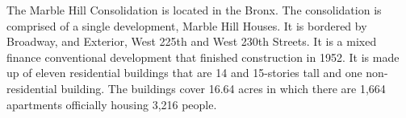 The Marble Hill Consolidation is located in the Bronx. The consolidation is comprised of a single development, Marble Hill Houses. It is bordered by Broadway, and Exterior, West 225th and West 230th Streets. It is a mixed finance conventional development that finished construction in 1952. It is made up of eleven residential buildings that are 14 and 15-stories tall and one non-residential building. The buildings cover 16.64 acres in which there are 1,664 apartments officially housing 3,216 people.